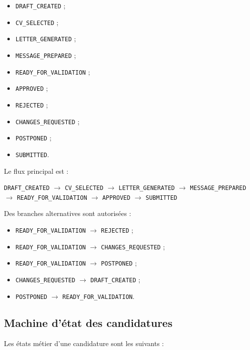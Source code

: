 \documentclass[11pt,a4paper]{article}
\begin{document}
\begin{itemize}
    \item \texttt{DRAFT\_CREATED} ;
    \item \texttt{CV\_SELECTED} ;
    \item \texttt{LETTER\_GENERATED} ;
    \item \texttt{MESSAGE\_PREPARED} ;
    \item \texttt{READY\_FOR\_VALIDATION} ;
    \item \texttt{APPROVED} ;
    \item \texttt{REJECTED} ;
    \item \texttt{CHANGES\_REQUESTED} ;
    \item \texttt{POSTPONED} ;
    \item \texttt{SUBMITTED}.
\end{itemize}

Le flux principal est :

\begin{center}
\texttt{DRAFT\_CREATED}
$\rightarrow$
\texttt{CV\_SELECTED}
$\rightarrow$
\texttt{LETTER\_GENERATED}
$\rightarrow$
\texttt{MESSAGE\_PREPARED}
$\rightarrow$
\texttt{READY\_FOR\_VALIDATION}
$\rightarrow$
\texttt{APPROVED}
$\rightarrow$
\texttt{SUBMITTED}
\end{center}

Des branches alternatives sont autorisées :

\begin{itemize}
    \item \texttt{READY\_FOR\_VALIDATION} $\rightarrow$ \texttt{REJECTED} ;
    \item \texttt{READY\_FOR\_VALIDATION} $\rightarrow$ \texttt{CHANGES\_REQUESTED} ;
    \item \texttt{READY\_FOR\_VALIDATION} $\rightarrow$ \texttt{POSTPONED} ;
    \item \texttt{CHANGES\_REQUESTED} $\rightarrow$ \texttt{DRAFT\_CREATED} ;
    \item \texttt{POSTPONED} $\rightarrow$ \texttt{READY\_FOR\_VALIDATION}.
\end{itemize}

\subsection{Machine d’état des candidatures}

Les états métier d’une candidature sont les suivants :
\end{document}
